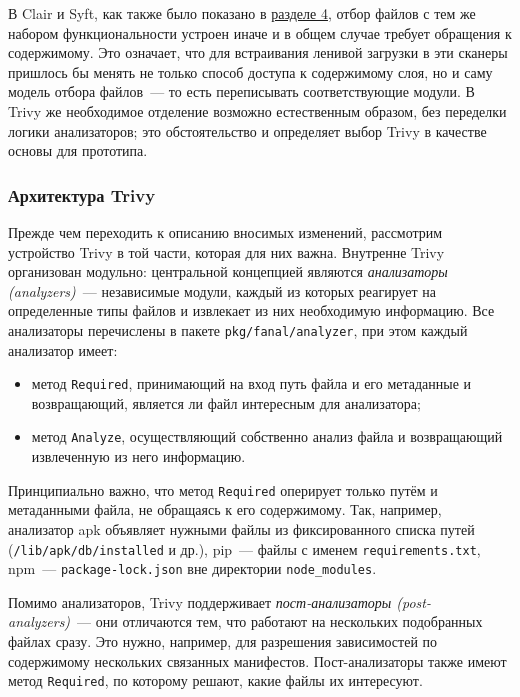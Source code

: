 В Clair и Syft, как также было показано в \hyperref[sec:Chapter3]{разделе 4}, отбор файлов с тем же набором функциональности устроен иначе и в общем случае требует обращения к содержимому. Это означает, что для встраивания ленивой загрузки в эти сканеры пришлось бы менять не только способ доступа к содержимому слоя, но и саму модель отбора файлов~--- то есть переписывать соответствующие модули. В Trivy же необходимое отделение возможно естественным образом, без переделки логики анализаторов; это обстоятельство и определяет выбор Trivy в качестве основы для прототипа.

\subsubsection{Архитектура Trivy}

Прежде чем переходить к описанию вносимых изменений, рассмотрим устройство Trivy в той части, которая для них важна. Внутренне Trivy организован модульно: центральной концепцией являются \textit{анализаторы (analyzers)}~--- независимые модули, каждый из которых реагирует на определенные типы файлов и извлекает из них необходимую информацию. Все анализаторы перечислены в пакете \texttt{pkg/fanal/analyzer}, при этом каждый анализатор имеет:

\begin{itemize}
\item метод \texttt{Required}, принимающий на вход путь файла и его метаданные и возвращающий, является ли файл интересным для анализатора;
\item метод \texttt{Analyze}, осуществляющий собственно анализ файла и возвращающий извлеченную из него информацию.
\end{itemize}

Принципиально важно, что метод \texttt{Required} оперирует только путём и метаданными файла, не обращаясь к его содержимому. Так, например, анализатор apk объявляет нужными файлы из фиксированного списка путей (\texttt{/lib/apk/db/installed} и др.), pip~--- файлы с именем \texttt{requirements.txt}, npm~--- \texttt{package-lock.json} вне директории \texttt{node\_modules}.

Помимо анализаторов, Trivy поддерживает \textit{пост-анализаторы (post-analyzers)}~--- они отличаются тем, что работают на нескольких подобранных файлах сразу. Это нужно, например, для разрешения зависимостей по содержимому нескольких связанных манифестов. Пост-анализаторы также имеют метод \texttt{Required}, по которому решают, какие файлы их интересуют.

